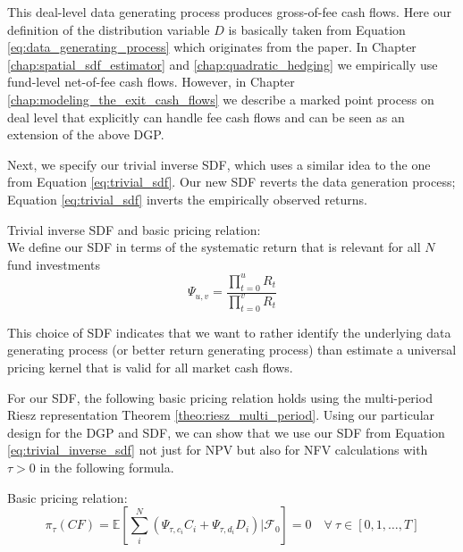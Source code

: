 \begin{remark}
	This deal-level data generating process produces gross-of-fee cash flows.
	Here our definition of the distribution variable $D$ is basically taken from Equation \ref{eq:data_generating_process} which originates from the \cite{ACGP18} paper.
	In Chapter \ref{chap:spatial_sdf_estimator} and \ref{chap:quadratic_hedging} we empirically use fund-level net-of-fee cash flows.
	However, in Chapter \ref{chap:modeling_the_exit_cash_flows} we describe a marked point process on deal level that explicitly can handle fee cash flows and can be seen as an extension of the above DGP. 
\end{remark}

Next, we specify our trivial inverse SDF, which uses a similar idea to the one from Equation \ref{eq:trivial_sdf}.
Our new SDF reverts the data generation process; Equation \ref{eq:trivial_sdf} inverts the empirically observed returns.

\begin{assume}
	\label{ass:trivial_inverse_sdf}
	Trivial inverse SDF and basic pricing relation: \\
	We define our SDF in terms of the systematic return that is relevant for all $N$ fund investments
	\begin{equation}
		\label{eq:trivial_inverse_sdf}
		\Psi_{u,v} = \frac{\prod_{t=0}^{u} R_t}{\prod_{t=0}^{v} R_t}
	\end{equation}
\end{assume}

This choice of SDF indicates that we want to rather identify the underlying data generating process (or better return generating process) than estimate a universal pricing kernel that is valid for all market cash flows.

For our SDF, the following basic pricing relation holds using the multi-period Riesz representation Theorem \ref{theo:riesz_multi_period}.
Using our particular design for the DGP and SDF, we can show that we use our SDF from Equation \ref{eq:trivial_inverse_sdf} not just for NPV but also for NFV calculations with $\tau>0$ in the following formula.

\begin{proposition}
	\label{prop:basic_pricing_relation}
	Basic pricing relation:
	\[
	\pi_{\tau} \left( CF \right) =
	\mathbb{E} \left[ 
	\sum_i^N
	\left(
	\Psi_{\tau,c_i} C_i + \Psi_{\tau,d_i} D_i 
	\right)
	\left| \mathcal{F}_{0} \right.
	\right] = 0
	\quad \forall \ \tau \in \left[0,1, \dots, T \right]
	\]
\end{proposition}


